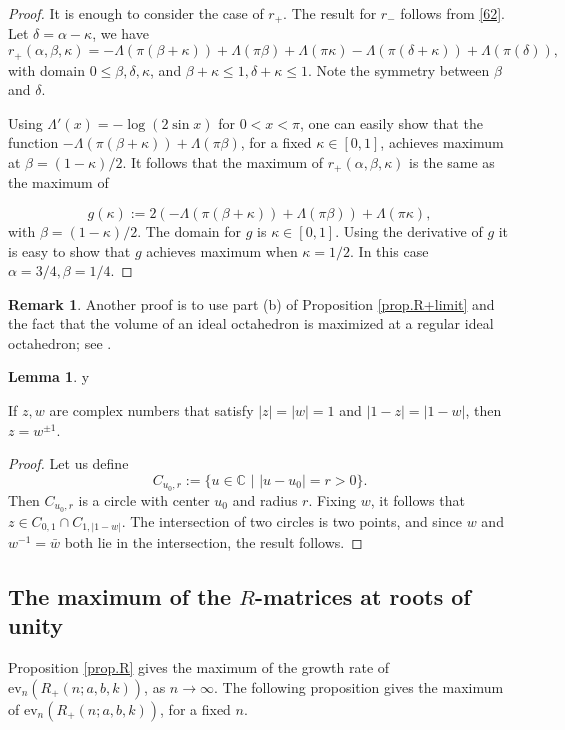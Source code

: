 \documentclass{amsart}
\theoremstyle{definition}
\newtheorem{lemma}[theorem]{Lemma}
\newtheorem{remark}[theorem]{Remark}
\def\printname#1{
    \if\draft y
        \smash{\makebox[0pt]{\hspace{-0.5in}
            \raisebox{8pt}{\tt\tiny #1}}}
    \fi
}
\def\lbl#1{\label{#1}\printname{#1}}
\def\BC{\mathbb C}
\def\a{\alpha}
\def\La{\Lambda}
\def\d{\delta}
\def\b{\beta}
\def\k{\kappa}
\def\ev{\mathrm{ev}}
\begin{document}
\begin{proof}
It is enough to consider the case of $r_+$. The result
for $r_-$ follows from \eqref{62}. Let $\d = \a -\k$, we have
$$
r_+(\a,\b,\k) = -\La(\pi(\b+\k)) +
\La(\pi\b)+\La(\pi\k)-\La(\pi(\d+ \k))+\La(\pi(\d)),
$$
with domain $ 0\le \b,\d,\k$, and $ \b+\k \le 1, \d+\k \le 1$. Note
the symmetry between $\b$ and $\d$.

Using $\La'(x) = - \log(2\sin x)$ for $ 0 <x < \pi$, one can easily
show that the function $-\La(\pi(\b+\k)) + \La(\pi\b)$, for a fixed
$\k \in [0,1]$, achieves maximum at $ \b = (1-\k)/2$. It follows
that the maximum of $r_+(\a,\b,\k)$ is the same as the maximum of

$$
g(\k):= 2(-\La(\pi(\b+\k)) + \La(\pi\b)) + \La(\pi\k),
$$
with $ \b = (1-\k)/2$. The domain for $g$ is $\k \in [0,1]$. Using
the derivative of $g$ it is easy to show that $g$ achieves maximum
when $\k=1/2$. In this case $\a=3/4, \b=1/4$.
\end{proof}

\begin{remark}
Another proof is to use part (b) of Proposition \ref{prop.R+limit} and
the fact that the volume of an ideal octahedron is maximized at a regular
ideal octahedron; see \cite{Ra}.
\end{remark}


\begin{lemma}
\lbl{lem.2circles}
If $z,w$ are complex numbers that satisfy $|z|=|w|=1$ and $|1-z|=|1-w|$,
then $z=w^{\pm 1}$.
\end{lemma}

\begin{proof}
Let us define
$$
C_{u_0,r}:=\{ u \in \BC \,\, | \,\, |u-u_0|=r>0 \}.
$$
Then $C_{u_0,r}$ is a circle with center $u_0$ and radius $r$. Fixing $w$, it
follows that $z \in C_{0,1} \cap C_{1,|1-w|}$. The intersection of two circles
is two points, and since $w$ and $w^{-1}=\bar{w}$ both lie in the intersection,
the result follows.
\end{proof}



\subsection{The maximum of the $R$-matrices at roots of unity}

Proposition \ref{prop.R} gives the maximum of the growth rate of
$\ev_n(R_+(n;a,b,k))$, as $n\to \infty$. The following proposition
gives the maximum of $\ev_n(R_+(n;a,b,k))$, for a fixed $n$.
\end{document}
